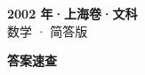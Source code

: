 \documentclass[zihao=-4, a4paper]{ctexart}
\begin{document}
\begin{center}
  {\Large\bfseries 2002 年·上海卷·文科}\\[4pt]
  {\large 数学 · 简答版}
\end{center}
\medskip
{}

\clearpage
{}
\begin{center}{\Large\bfseries 答案速查}\end{center}
\medskip

\end{document}
